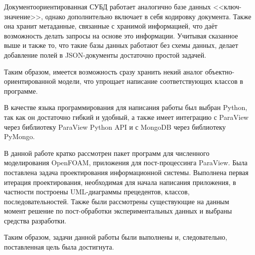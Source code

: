 \documentclass[14pt]{extreport}
\begin{document}
Документоориентированная СУБД работает аналогично базе данных <<ключ-значение>>, однако дополнительно включает в себя кодировку документа. Также она хранит метаданные, связанные с хранимой информацией, что даёт возможность делать запросы на основе это информации. 
Учитывая сказанное выше и также то, что такие базы данных работают без схемы данных, делает добавление полей в JSON-документы достаточно простой задачей. 

Таким образом, имеется возможность сразу хранить некий аналог объектно-ориентированной модели, что упрощает написание соответствующих классов в программе.

В качестве языка программирования для написания работы был выбран Python, так как он достаточно гибкий и удобный, а также имеет интеграцию с ParaView через библиотеку ParaView Python API и с MongoDB через библиотеку PyMongo. 


\conclusions

В данной работе кратко рассмотрен пакет программ для численного моделирования OpenFOAM, приложения для пост-процессинга ParaView. Была поставлена задача проектирования информационной системы. Выполнена первая итерация проектирования, необходимая для начала написания приложения, в частности построены UML-диаграммы прецедентов, классов, последовательностей. Также были рассмотрены существующие на данным момент решение по пост-обработки экспериментальных данных и выбраны средства разработки.

Таким образом, задачи данной работы были выполнены и, следовательно, поставленная цель была достигнута. 


% 
\end{document}
